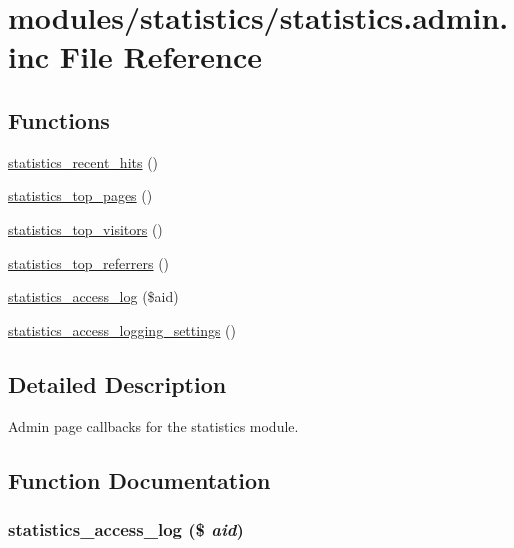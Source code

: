 \hypertarget{statistics_8admin_8inc}{
\section{modules/statistics/statistics.admin.inc File Reference}
\label{statistics_8admin_8inc}
}
\subsection*{Functions}
\begin{CompactItemize}
\item 
\hyperlink{statistics_8admin_8inc_27cb7cc9ddce90da1b0a6c8c5e469dc9}{statistics\_\-recent\_\-hits} ()
\item 
\hyperlink{statistics_8admin_8inc_9bae73cb7e5a689cbe7e43aefd9205fc}{statistics\_\-top\_\-pages} ()
\item 
\hyperlink{statistics_8admin_8inc_39dd048ed9a9e6eef337edcbc8ef7501}{statistics\_\-top\_\-visitors} ()
\item 
\hyperlink{statistics_8admin_8inc_18a38dae66754e711f1d04ec2fe4e3e1}{statistics\_\-top\_\-referrers} ()
\item 
\hyperlink{statistics_8admin_8inc_ca44598ce09dc1c87313b2bef40e3807}{statistics\_\-access\_\-log} (\$aid)
\item 
\hyperlink{group__forms_g78aa8d75d57df6385e2c3c24697ce2a9}{statistics\_\-access\_\-logging\_\-settings} ()
\end{CompactItemize}


\subsection{Detailed Description}
Admin page callbacks for the statistics module. 

\subsection{Function Documentation}
\hypertarget{statistics_8admin_8inc_ca44598ce09dc1c87313b2bef40e3807}{
\subsubsection[{statistics\_\-access\_\-log}]{\setlength{\rightskip}{0pt plus 5cm}statistics\_\-access\_\-log (\$ {\em aid})}}
\label{statistics_8admin_8inc_ca44598ce09dc1c87313b2bef40e3807}



